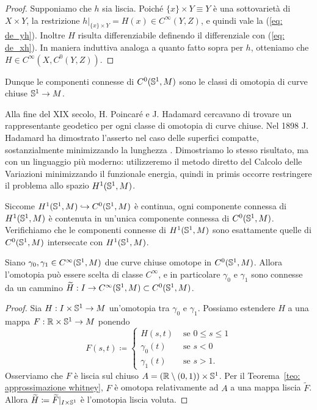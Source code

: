 \begin{proof}
	Supponiamo che \(h\) sia liscia. Poiché \(\{x\} \times Y \equiv Y\) è una sottovarietà di \(X \times Y\), la restrizione \(h|_{\{x\} \times Y} = H(x) \in C^\infty(Y,Z)\), e quindi vale la (\ref{eq: de_yh}). Inoltre \(H\) risulta differenziabile definendo il differenziale con (\ref{eq: de_xh}). In maniera induttiva analoga a quanto fatto sopra per \(h\), otteniamo che \(H \in C^\infty(X,C^0(Y,Z))\).
\end{proof}


Dunque le componenti connesse di \(C^0(\mathbb{S}^1,M)\) sono le classi di omotopia di curve chiuse \(\mathbb{S}^1 \to M\). 

Alla fine del XIX secolo, H. Poincaré e J. Hadamard cercavano di trovare un rappresentante geodetico per ogni classe di omotopia di curve chiuse. Nel 1898 J. Hadamard ha dimostrato l'asserto nel caso delle superfici compatte, sostanzialmente minimizzando la lunghezza \cite{hadamard1898surfaces}. Dimostriamo lo stesso risultato, ma con un linguaggio più moderno: utilizzeremo il metodo diretto del Calcolo delle Variazioni minimizzando il funzionale energia, quindi in primis occorre restringere il problema allo spazio \(H^1(\mathbb{S}^1,M)\).

Siccome \( H^1(\mathbb{S}^1,M) \hookrightarrow C^0(\mathbb{S}^1,M)\) è continua, ogni componente connessa di \(H^1(\mathbb{S}^1,M)\) è contenuta in un'unica componente connessa di \(C^0(\mathbb{S}^1,M)\). Verifichiamo che le componenti connesse di \(H^1(\mathbb{S}^1,M)\) sono esattamente quelle di \(C^0(\mathbb{S}^1,M)\) intersecate con \(H^1(\mathbb{S}^1,M)\). 

\begin{lemma}\label{lemma: omotopie lisce}
	Siano \(\gamma_0, \gamma_1 \in C^\infty(\mathbb{S}^1,M)\) due curve chiuse omotope in \(C^0(\mathbb{S}^1,M)\). Allora l'omotopia può essere scelta di classe \(C^\infty\), e in particolare \(\gamma_0\) e \(\gamma_1\) sono connesse da un cammino \(\widetilde{H}:I \to C^\infty(\mathbb{S}^1,M) \subset C^0(\mathbb{S}^1,M)\).
\end{lemma}
\begin{proof}
	Sia \(H: I \times \mathbb{S}^1 \to M\) un'omotopia tra \(\gamma_0\) e \(\gamma_1\). Possiamo estendere \(H\) a una mappa \(F: \mathbb{R} \times \mathbb{S}^1 \to M\) ponendo
	\[
		F(s,t) \coloneq \begin{cases}
			H(s,t) & \text{ se } 0\leq s \leq 1 \\
			\gamma_0(t) & \text{ se } s <0 \\
			\gamma_1(t) &\text{ se }s>1.
		\end{cases}
	\]
	Osserviamo che \(F\) è liscia sul chiuso \(A = (\mathbb{R} \setminus (0,1)) \times \mathbb{S}^1\). Per il Teorema~\ref{teo: approssimazione whitney}, \(F\) è omotopa relativamente ad \(A\) a una mappa liscia \(\widetilde{F}\). Allora \(\widetilde{H} \coloneq \widetilde{F}|_{I \times \mathbb{S}^1}\) è l'omotopia liscia voluta. 
\end{proof}


